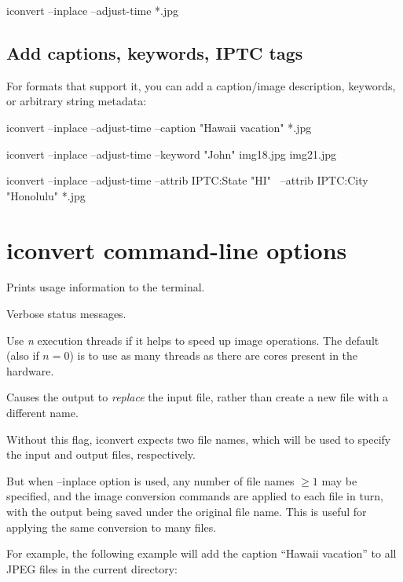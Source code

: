 \begin{code}
    iconvert --inplace --adjust-time *.jpg
\end{code}

\subsection*{Add captions, keywords, IPTC tags}

For formats that support it, you can add a caption/image description,
keywords, or arbitrary string metadata:

\begin{code}
    iconvert --inplace --adjust-time --caption "Hawaii vacation" *.jpg

    iconvert --inplace --adjust-time --keyword "John" img18.jpg img21.jpg

    iconvert --inplace --adjust-time --attrib IPTC:State "HI" \
              --attrib IPTC:City "Honolulu" *.jpg
\end{code}

\medskip

\section{{\cf iconvert} command-line options}

Prints usage information to the terminal.
\apiend

Verbose status messages.
\apiend

Use \emph{n} execution threads if it helps to speed up image operations.
The default (also if $n=0$) is to use as many threads as there are cores
present in the hardware.
\apiend

Causes the output to \emph{replace} the input file, rather than create a
new file with a different name.

Without this flag, {\cf iconvert} expects two file names, which will
be used to specify the input and output files, respectively.

But when {\cf --inplace} option is used, any number of file names $\ge 1$ may
be specified, and the image conversion commands are applied to each file
in turn, with the output being saved under the original file name.  This
is useful for applying the same conversion to many files.  

For example, the following example will add the caption ``Hawaii
vacation'' to all JPEG files in the current directory:

